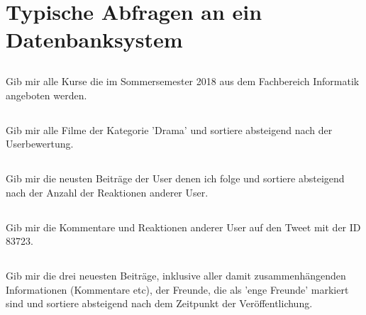 
\newcommand{\dozent}{Prof. Dr. Agnès Voisard \\ Nicolas Lehmann}					%
\newcommand{\tutor}{Alexander Schulz}						%
\newcommand{\tutoriumNo}{04}				%
\newcommand{\ubungNo}{01}									%
\newcommand{\veranstaltung}{Datenbanksysteme}	%
\newcommand{\semester}{SoSe 18}						%
\newcommand{\studenten}{Mark Niehues}			%



\section{Typische Abfragen an ein Datenbanksystem}
\subsection{}
Gib mir alle Kurse die im Sommersemester 2018 aus dem Fachbereich Informatik angeboten werden.

\subsection{}
Gib mir alle Filme der Kategorie 'Drama' und sortiere absteigend nach der Userbewertung.

\subsection{}
Gib mir die neusten Beiträge der User denen ich folge und sortiere absteigend nach der Anzahl der Reaktionen anderer User.

\subsection{}
Gib mir die Kommentare und Reaktionen anderer User auf den Tweet mit der ID 83723.

\subsection{}
Gib mir die drei neuesten Beiträge, inklusive aller damit zusammenhängenden Informationen (Kommentare etc), der Freunde, die als 'enge Freunde' markiert sind und sortiere absteigend nach dem Zeitpunkt der Veröffentlichung.

\printbibliography %


